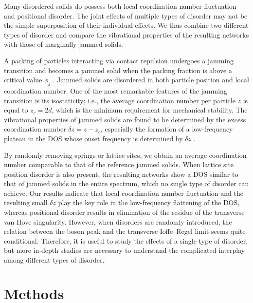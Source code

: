 \documentclass[twocolumn,printnumbers,amsmath,amssymb,prl,verbatim]{revtex4}
\begin{document}
Many disordered solids do possess both local coordination number fluctuation and positional disorder. The joint effects of multiple types of disorder may not be the simple superposition of their individual effects. We thus combine two different types of disorder and compare the vibrational properties of the resulting networks with those of marginally jammed solids.

A packing of particles interacting via contact repulsion undergoes a jamming transition and becomes a jammed solid when the packing fraction is above a critical value $\phi_j$ \cite{liu1,liu2,hecke1,xu1,ohern1,parisi1,torquato,matthieureview}. Jammed solids are disordered in both particle position and local coordination number. One of the most remarkable features of the jamming transition is its isostaticity; i.e., the average coordination number per particle $z$ is equal to $z_c=2d$, which is the minimum requirement for mechanical stability. The vibrational properties of jammed solids are found to be determined by the excess coordination number $\delta z = z- z_c$, especially the formation of a low-frequency plateau in the DOS whose onset frequency is determined by $\delta z$ \cite{silbert,wyart1}.

By randomly removing springs or lattice sites, we obtain an average coordination number comparable to that of the reference jammed solids. When lattice site position disorder is also present, the resulting networks show a DOS similar to that of jammed solids in the entire spectrum, which no single type of disorder can achieve. Our results indicate that local coordination number fluctuation and the resulting small $\delta z$ play the key role in the low-frequency flattening of the DOS, whereas positional disorder results in elimination of the residue of the transverse van Hove singularity. However, when disorders are randomly introduced, the relation between the boson peak and the transverse Ioffe--Regel limit seems quite conditional. Therefore, it is useful to study the effects of a single type of disorder, but more in-depth studies are necessary to understand the complicated interplay among different types of disorder.


\section{Methods}
\label{sec:method}
\end{document}
